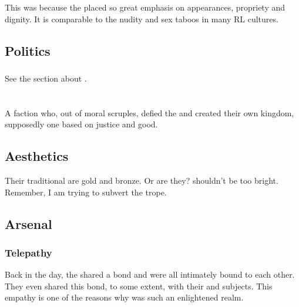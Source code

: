 This was because the \CiriathSepher placed so great emphasis on appearances, propriety and dignity. 
It is comparable to the nudity and sex taboos in many RL cultures. 









\subsection{Politics}





\subsubsection{\Azraid}
See the section about .















\section{\Kezerad}
A \resphan{} faction who, out of moral scruples, defied the \banes{} and created their own kingdom, supposedly one based on justice and good. 









\subsection{Aesthetics}
Their traditional \colours are gold and bronze. 
Or are they? 
\Kezerad{} shouldn't be too bright. 
Remember, I am trying to subvert the  trope. 







\subsection{Arsenal}
\subsubsection{Telepathy}
Back in the day, the \Kezeradi{} shared a  bond and were all intimately bound to each other. They even shared this bond, to some extent, with their \human{} and \nephilic{} subjects. This empathy is one of the reasons why \Kezerad{} was such an enlightened realm. 

